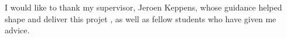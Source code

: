 I would like to thank my supervisor, Jeroen Keppens, whose guidance helped shape and deliver this projet , as well as fellow students who have given me advice.